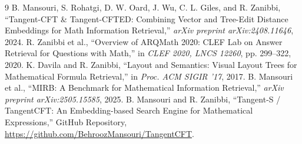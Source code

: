 \documentclass[11pt,a4paper]{article}
\begin{document}
\begin{thebibliography}{9}
	 B. Mansouri, S. Rohatgi, D. W. Oard, J. Wu, C. L. Giles, and R. Zanibbi, ``Tangent-CFT \& Tangent-CFTED: Combining Vector and Tree-Edit Distance Embeddings for Math Information Retrieval,'' \textit{arXiv preprint arXiv:2408.11646}, 2024.
	 R. Zanibbi et al., ``Overview of ARQMath 2020: CLEF Lab on Answer Retrieval for Questions with Math,'' in \textit{CLEF 2020, LNCS 12260}, pp. 299--322, 2020.
	 K. Davila and R. Zanibbi, ``Layout and Semantics: Visual Layout Trees for Mathematical Formula Retrieval,'' in \textit{Proc. ACM SIGIR '17}, 2017.
	 B. Mansouri et al., ``MIRB: A Benchmark for Mathematical Information Retrieval,'' \textit{arXiv preprint arXiv:2505.15585}, 2025.
	 B. Mansouri and R. Zanibbi, ``Tangent-S / TangentCFT: An Embedding-based Search Engine for Mathematical Expressions,'' GitHub Repository, \url{https://github.com/BehroozMansouri/TangentCFT}.
\end{thebibliography}
	
\end{document}
